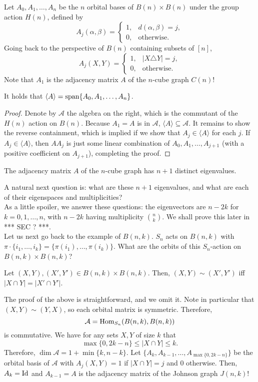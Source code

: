 	Let $A_0,A_1,\ldots,A_n$ be the $n$ orbital bases of $B(n) \times B(n)$ under the group action $H(n)$, defined by
	\[ A_j(\alpha,\beta) = \begin{cases} 1, & d(\alpha,\beta) = j, \\ 0, & \text{otherwise.} \end{cases} \]
	Going back to the perspective of $B(n)$ containing subsets of $[n]$,
	\[ A_j(X,Y) = \begin{cases} 1, & |X\triangle Y| = j, \\ 0, & \text{otherwise.} \end{cases} \]
	Note that $A_1$ is the adjacency matrix $A$ of the $n$-cube graph $C(n)$!
	\begin{fprop}
		\label{prop: ncube-adj-eigenvals}
		It holds that $\langle A\rangle = \operatorname{span}\{A_0,A_1,\ldots,A_n\}$.
	\end{fprop}
	\begin{proof}
		Denote by $\mathcal{A}$ the algebra on the right, which is the commutant of the $H(n)$ action on $B(n)$. Because $A_1 = A$ is in $\mathcal{A}$, $\langle A\rangle \subseteq \mathcal{A}$. It remains to show the reverse containment, which is implied if we show that $A_j \in \langle A\rangle$ for each $j$. If $A_j \in \langle A\rangle$, then $AA_j$ is just some linear combination of $A_0,A_1,\ldots,A_{j+1}$ (with a positive coefficient on $A_{j+1}$), completing the proof.
	\end{proof}

	\begin{fcor}
		The adjacency matrix $A$ of the $n$-cube graph has $n+1$ distinct eigenvalues.
	\end{fcor}

	A natural next question is: what are these $n+1$ eigenvalues, and what are each of their eigenspaces and multiplicities?\\
	As a little spoiler, we answer these questions: the eigenvectors are $n-2k$ for $k=0,1,\ldots,n$, with $n-2k$ having multiplicity $\binom{n}{k}$. We shall prove this later in *** SEC ? ***. \\

	Let us next go back to the example of $B(n,k)$. $S_n$ acts on $B(n,k)$ with $\pi \cdot \{i_1,\ldots,i_k\} = \{\pi(i_1),\ldots,\pi(i_k)\}$. What are the orbits of this $S_n$-action on $B(n,k) \times B(n,k)$?

	\begin{flem}
		Let $(X,Y), (X',Y') \in B(n,k) \times B(n,k)$. Then, $(X,Y) \sim (X',Y')$ iff $|X \cap Y| = |X' \cap Y'|$.
	\end{flem}
	The proof of the above is straightforward, and we omit it. Note in particular that $(X,Y) \sim (Y,X)$, so each orbital matrix is symmetric. Therefore,
	\[ \mathcal{A} = \operatorname{Hom}_{S_n}(B(n,k),B(n,k)) \]
	is commutative. We have for any sets $X,Y$ of size $k$ that
	\[ \max\{0,2k-n\} \le |X \cap Y| \le k. \]
	Therefore, $\dim \mathcal{A} = 1 + \min\{k,n-k\}$. Let $\{A_k,A_{k-1},\ldots,A_{\max\{0,2k-n\}}\}$ be the orbital basis of $\mathcal{A}$ with $A_j(X,Y) = 1$ if $|X \cap Y| = j$ and $0$ otherwise. Then,$A_k = \operatorname{Id}$ and $A_{k-1} = A$ is the adjacency matrix of the Johnson graph $J(n,k)$!

